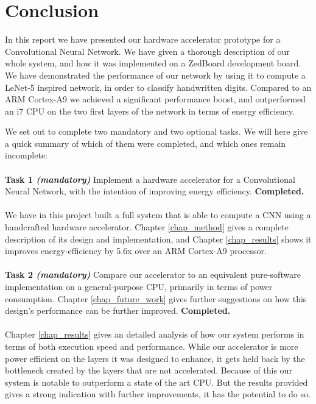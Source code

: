 \chapter{Conclusion}

In this report we have presented our hardware accelerator prototype for a Convolutional Neural Network. We have given a thorough description of our whole system, and how it was implemented on a ZedBoard development board. We have demonstrated the performance of our network by using it to compute a LeNet-5 inspired network, in order to classify handwritten digits. Compared to an ARM Cortex-A9 we achieved a significant performance boost, and outperformed an i7 CPU on the two first layers of the network in terms of energy efficiency. 

We set out to complete two mandatory and two optional tasks. We will here give a quick summary of which of them were completed, and which ones remain incomplete: \\ \hfil \\ \hfil
\textbf{Task 1 \textit{(mandatory)}} Implement a hardware accelerator for a Convolutional Neural Network, with the intention of improving energy efficiency. \textbf{Completed.} \\ \hfil \\ \hfil
We have in this project built a full system that is able to compute a CNN using a handcrafted hardware accelerator. Chapter \ref{chap_method} gives a complete description of its design and implementation, and Chapter \ref{chap_results} shows it improves energy-efficiency by 5.6x over an ARM Cortex-A9 processor.  \\ \hfil \\ \hfil
\textbf{Task 2 \textit{(mandatory)}} Compare our accelerator to an equivalent pure-software implementation on a general-purpose CPU, primarily in terms of power consumption. Chapter \ref{chap_future_work} gives further suggestions on how this design's performance can be further improved. \textbf{Completed.}  \\ \hfil \\ \hfil
Chapter \ref{chap_results} gives an detailed analysis of how our system performs in terms of both execution speed and performance. While our accelerator is more power efficient on the layers it was designed to enhance, it gets held back by the bottleneck created by the layers that are not accelerated. Because of this our system is notable to outperform a state of the art CPU. But the results provided gives a strong indication with further improvements, it has the potential to do so. \\ \hfil \\ \hfil
